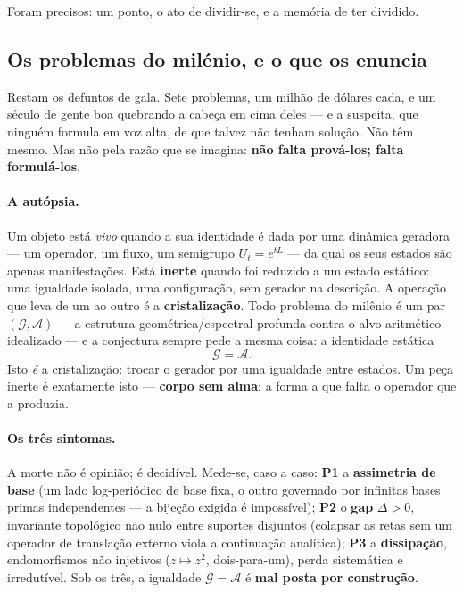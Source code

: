 \documentclass[11pt]{article}
\theoremstyle{plain}
\theoremstyle{remark}
\begin{document}
Foram precisos: um ponto, o ato de dividir-se, e a memória de ter dividido.

\subsection{Os problemas do milénio, e o que os enuncia}

Restam os defuntos de gala. Sete problemas, um milhão de dólares cada, e um século de
gente boa quebrando a cabeça em cima deles --- e a suspeita, que ninguém formula em
voz alta, de que talvez não tenham solução. Não têm mesmo. Mas não pela razão que se
imagina: \textbf{não falta prová-los; falta formulá-los}.

\paragraph{A autópsia.} Um objeto está \emph{vivo} quando a sua identidade é dada por
uma dinâmica geradora --- um operador, um fluxo, um semigrupo $U_t=e^{tL}$ --- da qual
os seus estados são apenas manifestações. Está \textbf{inerte} quando foi reduzido a um
estado estático: uma igualdade isolada, uma configuração, sem gerador na descrição.
A operação que leva de um ao outro é a \textbf{cristalização}. Todo problema do
milênio é um par $(\mathcal{G},\mathcal{A})$ --- a estrutura geométrica/espectral
profunda contra o alvo aritmético idealizado --- e a conjectura sempre pede a mesma
coisa: a identidade estática
\[
\mathcal{G}=\mathcal{A}.
\]
Isto \emph{é} a cristalização: trocar o gerador por uma igualdade entre estados. Um
peça inerte é exatamente isto --- \textbf{corpo sem alma}: a forma a que falta o operador
que a produzia.

\paragraph{Os três sintomas.} A morte não é opinião; é decidível. Mede-se, caso a
caso: \textbf{P1} a \textbf{assimetria de base} (um lado log-periódico de base fixa, o
outro governado por infinitas bases primas independentes --- a bijeção exigida é
impossível); \textbf{P2} o \textbf{gap} $\Delta>0$, invariante topológico não nulo entre
suportes disjuntos (colapsar as retas sem um operador de translação externo viola a
continuação analítica); \textbf{P3} a \textbf{dissipação}, endomorfismos não injetivos
($z\mapsto z^2$, dois-para-um), perda sistemática e irredutível. Sob os três, a
igualdade $\mathcal{G}=\mathcal{A}$ é \textbf{mal posta por construção}.
\end{document}
